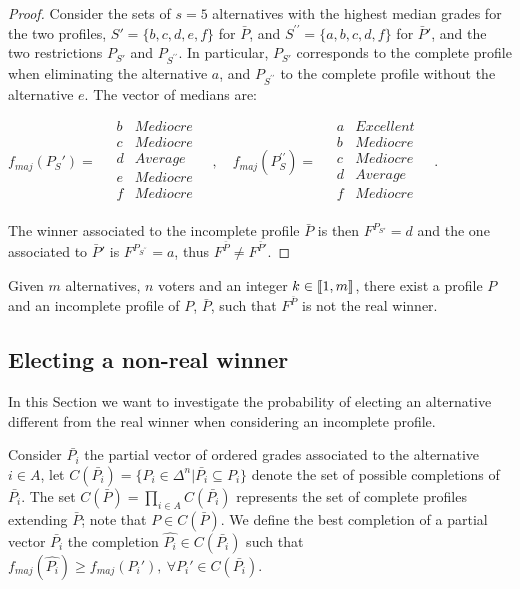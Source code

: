 \documentclass[version=3.21, pagesize, twoside=off, bibliography=totoc, DIV=calc, fontsize=12pt, a4paper]{scrartcl}
\begin{document}
\begin{proof}
	Consider the sets of $s=5$ alternatives with the highest median grades for the two profiles, $S'=\{b,c,d,e,f\}$ for $\bar{P}$, and $S^{\prime\prime}=\{a,b,c,d,f\}$ for $\bar{P}'$, and the two restrictions $P_{S'}$ and $P_{S^{\prime\prime}}$. In particular, $P_{S'}$ corresponds to the complete profile when eliminating the alternative $a$, and $P_{S^{\prime\prime}}$ to the complete profile without the alternative $e$.
	The vector of medians are:
	\begin{center}
		$f_{maj}(P_S')= \quad
		\begin{array}{cc}
			b &	Mediocre \\
			c &	Mediocre \\
			d &	Average	\\
			e &	Mediocre \\
			f & Mediocre \\
		\end{array} \quad,\quad%
		f_{maj}(P_S^{\prime\prime})= \quad
		\begin{array}{cc}
			a & Excellent \\
			b &	Mediocre \\
			c &	Mediocre \\
			d &	Average	\\
			f & Mediocre \\
		\end{array} \quad.
		$
	\end{center}
	The winner associated to the incomplete profile $\bar{P}$ is then $F^{P_{S'}} = d$ and the one associated to $\bar{P}'$ is $F^{P_{S^{\prime\prime}}} = a$, thus $F^{\bar{P}} \neq F^{\bar{P}'}$.
\end{proof}

\begin{corollary}
	Given $m$ alternatives, $n$ voters and an integer $k \in \llbracket1,m\rrbracket$, there exist a profile $P$ and an incomplete profile of $P$, $\bar{P}$, such that $F^{\bar{P}}$ is not the real winner.
\end{corollary}

\subsection{Electing a non-real winner}

In this Section we want to investigate the probability of electing an alternative different from the real winner when considering an incomplete profile.

Consider $\bar{P_i}$ the partial vector of ordered grades associated to the alternative $i\in A$, let $C(\bar{P_i}) = \{P_i \in \Delta^n | \bar{P_i} \subseteq P_i\}$ denote the set of possible completions of $\bar{P_i}$. The set $C(\bar{P}) = \prod_{i \in A} C(\bar{P_i})$ represents the set of complete profiles extending $\bar{P}$; note that $P \in C(\bar{P})$. We define the best completion of a partial vector $\bar{P_i}$ the completion $\hat{P_i}\in C(\bar{P_i})$ such that $f_{maj}(\hat{P_i})\geq f_{maj}(P_i'), \ \forall P_i' \in C(\bar{P_i})$.
\end{document}
